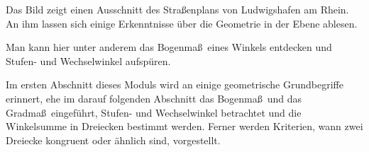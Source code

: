 \begin{MIntro}

Das Bild zeigt einen Ausschnitt des Stra\ss enplans von Ludwigshafen am Rhein. 
An ihm lassen sich einige Erkenntnisse \"uber die Geometrie in der Ebene ablesen.

\begin{center}
 
\end{center}

Man kann hier unter anderem das Bogenma\ss\ eines Winkels entdecken und 
Stufen- und Wechselwinkel aufsp\"uren. 

Im ersten Abschnitt dieses Moduls wird an einige geometrische Grundbegriffe 
erinnert, ehe im darauf folgenden Abschnitt das Bogenma\ss\ und das Gradma\ss\ 
eingef\"uhrt, Stufen- und Wechselwinkel betrachtet und die Winkelsumme in 
Dreiecken bestimmt werden. Ferner werden Kriterien, wann zwei Dreiecke 
kongruent oder \"ahnlich sind, vorgestellt.

\end{MIntro}


